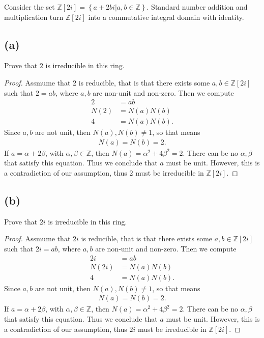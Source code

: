 \documentclass[10pt]{armath}
\newcommand{\Z}{\mathbb{Z}}
\newcommand{\zi}{\mathbb{Z}\left[2i\right]}
\begin{document}
Consider the set $\zi = \left\{a+2bi\vert a,b\in\Z\right\}$. Standard number
addition and multiplication turn $\zi$ into a commutative integral domain with
identity.

\subsection*{(a)}%
\label{sub:_a_}

Prove that $2$ is irreducible in this ring.

\begin{proof}
  Assmume that $2$ is reducible, that is that there exists some $a,b\in\zi$
  such that $2=ab$, where $a,b$ are non-unit and non-zero. Then we compute
  \begin{align*}
    2&=ab\\
    N(2)&=N(a)N(b)\\
    4&=N(a)N(b).
  \end{align*}
  Since $a,b$ are not unit, then $N(a),N(b)\neq 1$, so that means
  \begin{align*}
    N(a)=N(b)=2.
  \end{align*}
  If $a=\alpha+2\beta$, with $\alpha,\beta\in\Z$, then
  $N(a)=\alpha^2+4\beta^2=2$. There can be no $\alpha,\beta$ that satisfy this
  equation. Thus we conclude that $a$ must be unit. However, this is a
  contradiction of our assumption, thus $2$ must be irreducible in $\zi$.
\end{proof}

\subsection*{(b)}%
\label{sub:_b_}

Prove that $2i$ is irreducible in this ring.

\begin{proof}
  Assmume that $2i$ is reducible, that is that there exists some $a,b\in\zi$
  such that $2i=ab$, where $a,b$ are non-unit and non-zero. Then we compute
  \begin{align*}
    2i&=ab\\
    N(2i)&=N(a)N(b)\\
    4&=N(a)N(b).
  \end{align*}
  Since $a,b$ are not unit, then $N(a),N(b)\neq 1$, so that means
  \begin{align*}
    N(a)=N(b)=2.
  \end{align*}
  If $a=\alpha+2\beta$, with $\alpha,\beta\in\Z$, then
  $N(a)=\alpha^2+4\beta^2=2$. There can be no $\alpha,\beta$ that satisfy this
  equation. Thus we conclude that $a$ must be unit. However, this is a
  contradiction of our assumption, thus $2i$ must be irreducible in $\zi$.
\end{proof}
\end{document}
